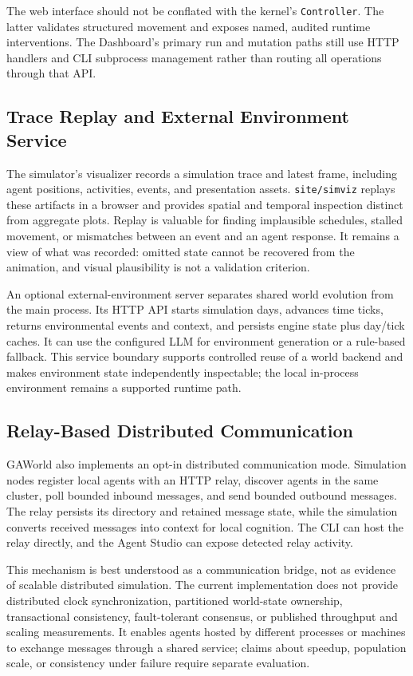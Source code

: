 The web interface should not be conflated with the kernel's
\texttt{Controller}.  The latter validates structured movement and exposes
named, audited runtime interventions.  The Dashboard's primary run and mutation
paths still use HTTP handlers and CLI subprocess management rather than routing
all operations through that API.

\subsection{Trace Replay and External Environment Service}

The simulator's visualizer records a simulation trace and latest frame,
including agent positions, activities, events, and presentation assets.
\texttt{site/simviz} replays these artifacts in a browser and provides spatial
and temporal inspection distinct from aggregate plots.  Replay is valuable for
finding implausible schedules, stalled movement, or mismatches between an event
and an agent response.  It remains a view of what was recorded: omitted state
cannot be recovered from the animation, and visual plausibility is not a
validation criterion.

An optional external-environment server separates shared world evolution from
the main process.  Its HTTP API starts simulation days, advances time ticks,
returns environmental events and context, and persists engine state plus
day/tick caches.  It can use the configured LLM for environment generation or a
rule-based fallback.  This service boundary supports controlled reuse of a
world backend and makes environment state independently inspectable; the local
in-process environment remains a supported runtime path.

\subsection{Relay-Based Distributed Communication}

GAWorld also implements an opt-in distributed communication mode.  Simulation
nodes register local agents with an HTTP relay, discover agents in the same
cluster, poll bounded inbound messages, and send bounded outbound messages.
The relay persists its directory and retained message state, while the
simulation converts received messages into context for local cognition.  The
CLI can host the relay directly, and the Agent Studio can expose detected relay
activity.

This mechanism is best understood as a communication bridge, not as evidence
of scalable distributed simulation.  The current implementation does not
provide distributed clock synchronization, partitioned world-state ownership,
transactional consistency, fault-tolerant consensus, or published throughput
and scaling measurements.  It enables agents hosted by different processes or
machines to exchange messages through a shared service; claims about speedup,
population scale, or consistency under failure require separate evaluation.

